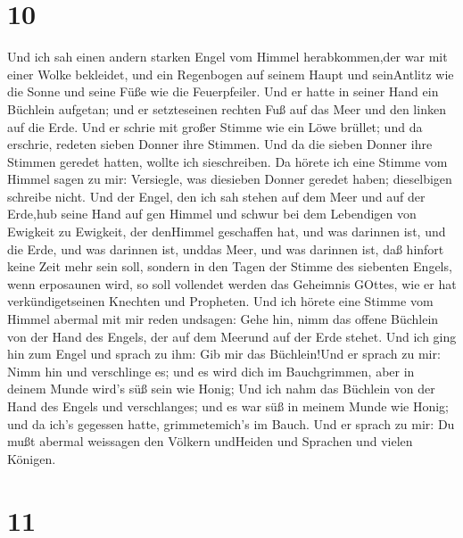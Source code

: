 \hypertarget{section-8}{%
\section{10}\label{section-8}}

 Und ich sah einen andern starken Engel vom Himmel
herabkommen,der war mit einer Wolke bekleidet, und ein Regenbogen auf
seinem Haupt und seinAntlitz wie die Sonne und seine Füße wie die
Feuerpfeiler.  Und er hatte in seiner Hand ein Büchlein
aufgetan; und er setzteseinen rechten Fuß auf das Meer und den linken
auf die Erde.  Und er schrie mit großer Stimme wie ein Löwe
brüllet; und da erschrie, redeten sieben Donner ihre Stimmen.
 Und da die sieben Donner ihre Stimmen geredet hatten,
wollte ich sieschreiben. Da hörete ich eine Stimme vom Himmel sagen zu
mir: Versiegle, was diesieben Donner geredet haben; dieselbigen schreibe
nicht.  Und der Engel, den ich sah stehen auf dem Meer und
auf der Erde,hub seine Hand auf gen Himmel  und schwur bei
dem Lebendigen von Ewigkeit zu Ewigkeit, der denHimmel geschaffen hat,
und was darinnen ist, und die Erde, und was darinnen ist, unddas Meer,
und was darinnen ist, daß hinfort keine Zeit mehr sein soll,
 sondern in den Tagen der Stimme des siebenten Engels, wenn
erposaunen wird, so soll vollendet werden das Geheimnis GOttes, wie er
hat verkündigetseinen Knechten und Propheten.  Und ich
hörete eine Stimme vom Himmel abermal mit mir reden undsagen: Gehe hin,
nimm das offene Büchlein von der Hand des Engels, der auf dem Meerund
auf der Erde stehet.  Und ich ging hin zum Engel und sprach
zu ihm: Gib mir das Büchlein!Und er sprach zu mir: Nimm hin und
verschlinge es; und es wird dich im Bauchgrimmen, aber in deinem Munde
wird's süß sein wie Honig;  Und ich nahm das Büchlein von
der Hand des Engels und verschlanges; und es war süß in meinem Munde wie
Honig; und da ich's gegessen hatte, grimmetemich's im Bauch.
 Und er sprach zu mir: Du mußt abermal weissagen den
Völkern undHeiden und Sprachen und vielen Königen.

\hypertarget{section-9}{%
\section{11}\label{section-9}}

